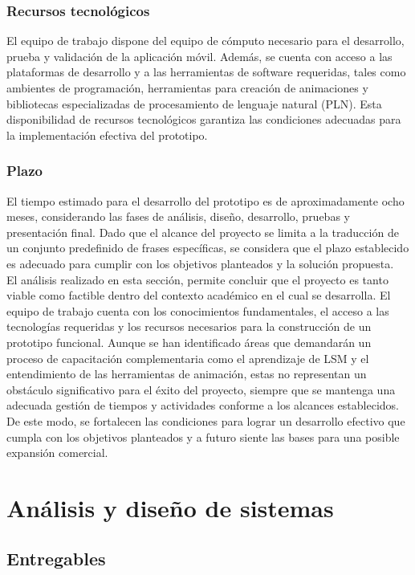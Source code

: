 \subsubsection{Recursos tecnológicos}
El equipo de trabajo dispone del equipo de cómputo necesario para el desarrollo, prueba y validación de la aplicación móvil. Además, se cuenta con acceso a las plataformas de desarrollo y a las herramientas de software requeridas, tales como ambientes de programación, herramientas para creación de animaciones y bibliotecas especializadas de procesamiento de lenguaje natural (PLN). Esta disponibilidad de recursos tecnológicos garantiza las condiciones adecuadas para la implementación efectiva del prototipo.

\subsubsection{Plazo}
El tiempo estimado para el desarrollo del prototipo es de aproximadamente ocho meses, considerando las fases de análisis, diseño, desarrollo, pruebas y presentación final. Dado que el alcance del proyecto se limita a la traducción de un conjunto predefinido de frases específicas, se considera que el plazo establecido es adecuado para cumplir con los objetivos planteados y la solución propuesta. \\


El análisis realizado en esta sección, permite concluir que el proyecto es tanto viable como factible dentro del contexto académico en el cual se desarrolla. El equipo de trabajo cuenta con los conocimientos fundamentales, el acceso a las tecnologías requeridas y los recursos necesarios para la construcción de un prototipo funcional. Aunque se han identificado áreas que demandarán un proceso de capacitación complementaria como el aprendizaje de LSM y el entendimiento de las herramientas de animación, estas no representan un obstáculo significativo para el éxito del proyecto, siempre que se mantenga una adecuada gestión de tiempos y actividades conforme a los alcances establecidos. De este modo, se fortalecen las condiciones para lograr un desarrollo efectivo que cumpla con los objetivos planteados y a futuro siente las bases para una posible expansión comercial.\\

\section{Análisis y diseño de sistemas}
\subsection{Entregables}

